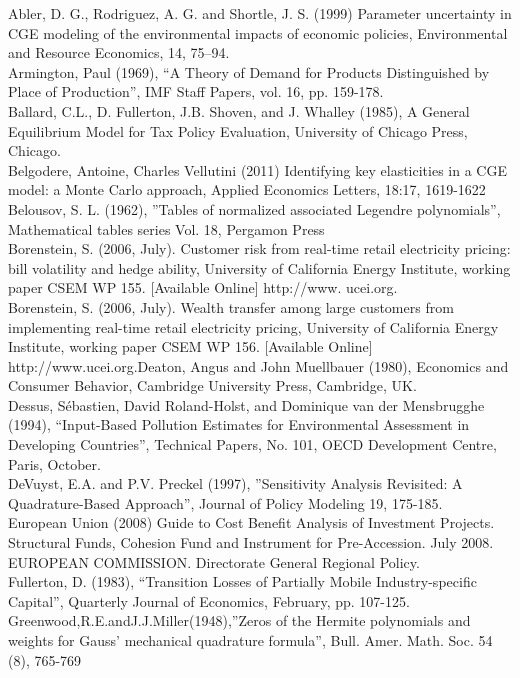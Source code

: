 \documentclass{article}
\begin{document}
Abler, D. G., Rodriguez, A. G. and Shortle, J. S. (1999) Parameter uncertainty in CGE modeling of the environmental impacts of economic policies, Environmental and Resource Economics, 14, 75–94.\\
Armington, Paul (1969), “A Theory of Demand for Products Distinguished by Place of Production”,  IMF Staff Papers, vol. 16, pp. 159-178.\\
Ballard, C.L., D. Fullerton, J.B. Shoven, and J. Whalley (1985), A General Equilibrium Model for Tax Policy Evaluation, University of Chicago Press, Chicago.\\
Belgodere, Antoine, Charles Vellutini (2011) Identifying key elasticities in a CGE model: a Monte Carlo approach, Applied Economics Letters, 18:17, 1619-1622\\
Belousov, S. L. (1962), ”Tables of normalized associated Legendre polynomials”, Mathematical tables series Vol. 18, Pergamon Press \\
Borenstein, S. (2006, July). Customer risk from real-time retail electricity pricing: bill volatility and hedge ability, University of California Energy Institute, working paper CSEM WP 155. [Available Online] http://www. ucei.org.\\
Borenstein, S. (2006, July). Wealth transfer among large customers from implementing real-time retail electricity pricing, University of California Energy Institute, working paper CSEM WP 156. [Available Online] http://www.ucei.org.Deaton, Angus and John Muellbauer (1980), Economics and Consumer Behavior, Cambridge University Press, Cambridge, UK.\\
Dessus, Sébastien, David Roland-Holst, and Dominique van der Mensbrugghe (1994), “Input-Based Pollution Estimates for Environmental Assessment in Developing Countries”, Technical Papers, No. 101, OECD Development Centre, Paris, October.\\
DeVuyst, E.A. and P.V. Preckel (1997), ”Sensitivity Analysis Revisited: A Quadrature-Based Approach”, Journal of Policy Modeling 19, 175-185. \\
European Union (2008) Guide to Cost Benefit Analysis of Investment Projects. Structural Funds, Cohesion Fund and Instrument for Pre-Accession. July 2008. EUROPEAN COMMISSION. Directorate General Regional Policy. \\
Fullerton, D. (1983), “Transition Losses of Partially Mobile Industry-specific Capital”, Quarterly Journal of Economics, February, pp. 107-125. \\
Greenwood,R.E.andJ.J.Miller(1948),”Zeros of the Hermite polynomials and weights for Gauss’ mechanical quadrature formula”, Bull. Amer. Math. Soc. 54 (8), 765-769  \\
\end{document}
